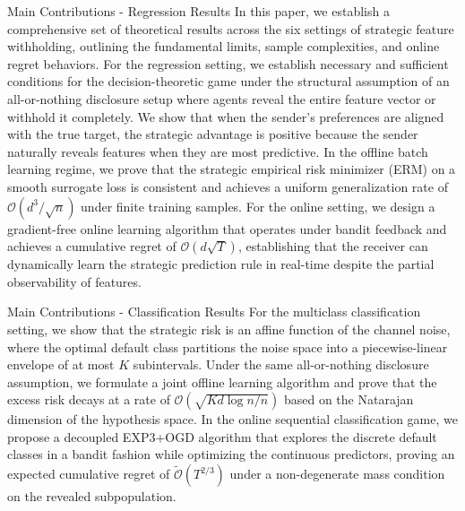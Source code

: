 \begin{sourceblock}{Main Contributions - Regression Results}
In this paper, we establish a comprehensive set of theoretical results across the six settings of strategic feature withholding, outlining the fundamental limits, sample complexities, and online regret behaviors. For the regression setting, we establish necessary and sufficient conditions for the decision-theoretic game under the structural assumption of an all-or-nothing disclosure setup where agents reveal the entire feature vector or withhold it completely. We show that when the sender's preferences are aligned with the true target, the strategic advantage is positive because the sender naturally reveals features when they are most predictive. In the offline batch learning regime, we prove that the strategic empirical risk minimizer (ERM) on a smooth surrogate loss is consistent and achieves a uniform generalization rate of $\mathcal{O}(d^3 / \sqrt{n})$ under finite training samples. For the online setting, we design a gradient-free online learning algorithm that operates under bandit feedback and achieves a cumulative regret of $\mathcal{O}(d \sqrt{T})$, establishing that the receiver can dynamically learn the strategic prediction rule in real-time despite the partial observability of features.
\end{sourceblock}

\begin{faqblock}
\faqanswers
{}
\end{faqblock}

\begin{sourceblock}{Main Contributions - Classification Results}
For the multiclass classification setting, we show that the strategic risk is an affine function of the channel noise, where the optimal default class partitions the noise space into a piecewise-linear envelope of at most $K$ subintervals. Under the same all-or-nothing disclosure assumption, we formulate a joint offline learning algorithm and prove that the excess risk decays at a rate of $\mathcal{O}(\sqrt{Kd \log n / n})$ based on the Natarajan dimension of the hypothesis space. In the online sequential classification game, we propose a decoupled EXP3+OGD algorithm that explores the discrete default classes in a bandit fashion while optimizing the continuous predictors, proving an expected cumulative regret of $\tilde{\mathcal{O}}(T^{2/3})$ under a non-degenerate mass condition on the revealed subpopulation.
\end{sourceblock}

